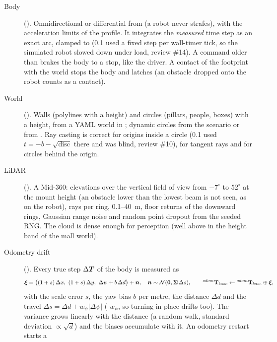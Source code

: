 \begin{description}
  \item[Body] (). Omnidirectional or differential from 
    (a  robot never strafes), with the acceleration limits of the profile. It
    integrates the \emph{measured} time step as an exact arc, clamped to  (0.1 used a
    fixed step per wall-timer tick, so the simulated robot slowed down under load, review \#14).
    A command older than  brakes the body to a stop, like the driver.
    A contact of the footprint with the world stops the body and latches 
    (an obstacle dropped onto the robot counts as a contact).
  \item[World] (). Walls (polylines with a height) and circles (pillars, people,
    boxes) with a height, from a YAML world in ; dynamic circles from the
    scenario or from . Ray casting is correct for origins inside a circle
    (0.1 used $t = -b - \sqrt{\mathrm{disc}}$ there and was blind, review \#10), for tangent rays
    and for circles behind the origin.
  \item[LiDAR] (). A Mid-360:  elevations over the vertical
    field of view from $-7^\circ$ to $52^\circ$ at the mount height (an obstacle lower than the
    lowest beam is not seen, as on the robot),  rays per ring, 0.1--40~m,
    floor returns of the downward rings, Gaussian range noise and random point dropout from the
    seeded RNG. The cloud is dense enough for perception (well above  in
    the height band of the mall world).
  \item[Odometry drift] (). Every true step $\Delta\boldsymbol{T}$ of the body is
    measured as
    \begin{equation}
      \boldsymbol{\xi} = \big((1+s)\,\Delta x,\ (1+s)\,\Delta y,\ \Delta\psi + b\,\Delta d\big) +
      \boldsymbol{n}, \quad \boldsymbol{n} \sim \mathcal{N}(\boldsymbol{0}, \boldsymbol{\Sigma}\,\Delta s), \qquad
      {}^{odom}\mathbf{T}_{base} \leftarrow {}^{odom}\mathbf{T}_{base} \oplus \boldsymbol{\xi},
    \end{equation}
    with the scale error $s$, the yaw bias $b$ per metre, the distance $\Delta d$ and the travel
    $\Delta s = \Delta d + w_\psi |\Delta\psi|$ ( $w_\psi$, so turning in
    place drifts too). The variance grows linearly with the distance (a random walk, standard
    deviation $\propto \sqrt{d}$) and the biases accumulate with it. An odometry restart starts a

\end{description}
